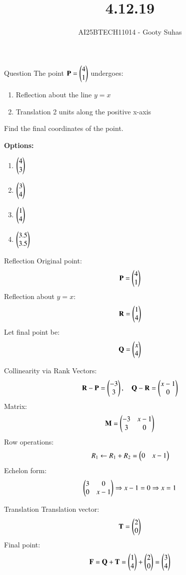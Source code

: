 \documentclass{beamer}
\title{4.12.19}
\author{AI25BTECH11014 - Gooty Suhas}
\begin{document}
\frame{\titlepage}

\begin{frame}{Question}
The point \( \mathbf{P} = \begin{pmatrix}4 \\ 1\end{pmatrix} \) undergoes:
\begin{enumerate}
    \item Reflection about the line \( y = x \)
    \item Translation 2 units along the positive x-axis
\end{enumerate}
Find the final coordinates of the point.

\textbf{Options:}
\begin{enumerate}[label=\alph*)]
    \item \( \begin{pmatrix}4 \\ 3\end{pmatrix} \) \vspace{0.2cm}
    \item \( \begin{pmatrix}3 \\ 4\end{pmatrix} \) \vspace{0.2cm}
    \item \( \begin{pmatrix}1 \\ 4\end{pmatrix} \) \vspace{0.2cm}
    \item \( \begin{pmatrix}3.5 \\ 3.5\end{pmatrix} \)
\end{enumerate}
\end{frame}

\begin{frame}{Reflection}
Original point:
\[
\mathbf{P} = \begin{pmatrix}4 \\ 1\end{pmatrix}
\]
Reflection about \( y = x \):
\[
\mathbf{R} = \begin{pmatrix}1 \\ 4\end{pmatrix}
\]
Let final point be:
\[
\mathbf{Q} = \begin{pmatrix}x \\ 4\end{pmatrix}
\]
\end{frame}

\begin{frame}{Collinearity via Rank}
Vectors:
\[
\mathbf{R} - \mathbf{P} = \begin{pmatrix}-3 \\ 3\end{pmatrix}, \quad
\mathbf{Q} - \mathbf{R} = \begin{pmatrix}x - 1 \\ 0\end{pmatrix}
\]
Matrix:
\[
\mathbf{M} = \begin{pmatrix}-3 & x - 1 \\ 3 & 0\end{pmatrix}
\]
Row operations:
\[
R_1 \leftarrow R_1 + R_2 = \begin{pmatrix}0 & x - 1\end{pmatrix}
\]
Echelon form:
\[
\begin{pmatrix}3 & 0 \\ 0 & x - 1\end{pmatrix}
\Rightarrow x - 1 = 0 \Rightarrow x = 1
\]
\end{frame}

\begin{frame}{Translation}
Translation vector:
\[
\mathbf{T} = \begin{pmatrix}2 \\ 0\end{pmatrix}
\]
Final point:
\[
\mathbf{F} = \mathbf{Q} + \mathbf{T} = \begin{pmatrix}1 \\ 4\end{pmatrix} + \begin{pmatrix}2 \\ 0\end{pmatrix} = \begin{pmatrix}3 \\ 4\end{pmatrix}
\]
\end{frame}
\end{document}

